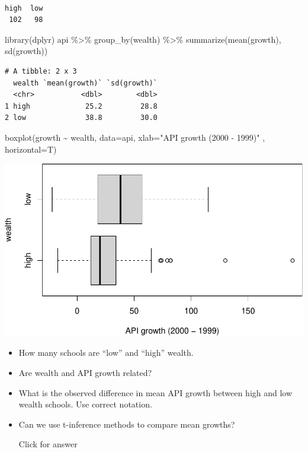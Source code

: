 \documentclass[
]{book}
\newenvironment{Shaded}{\begin{snugshade}}{\end{snugshade}}
\newcommand{\AttributeTok}[1]{\textcolor[rgb]{0.77,0.63,0.00}{#1}}
\newcommand{\FunctionTok}[1]{\textcolor[rgb]{0.00,0.00,0.00}{#1}}
\newcommand{\NormalTok}[1]{#1}
\newcommand{\SpecialCharTok}[1]{\textcolor[rgb]{0.00,0.00,0.00}{#1}}
\newcommand{\StringTok}[1]{\textcolor[rgb]{0.31,0.60,0.02}{#1}}
\providecommand{\tightlist}{%
  \setlength{\itemsep}{0pt}\setlength{\parskip}{0pt}}
\begin{document}
\begin{verbatim}

high  low 
 102   98 
\end{verbatim}

\begin{Shaded}
\begin{Highlighting}[]
\FunctionTok{library}\NormalTok{(dplyr)}
\NormalTok{api }\SpecialCharTok{\%\textgreater{}\%} \FunctionTok{group\_by}\NormalTok{(wealth) }\SpecialCharTok{\%\textgreater{}\%} \FunctionTok{summarize}\NormalTok{(}\FunctionTok{mean}\NormalTok{(growth), }\FunctionTok{sd}\NormalTok{(growth))}
\end{Highlighting}
\end{Shaded}

\begin{verbatim}
# A tibble: 2 x 3
  wealth `mean(growth)` `sd(growth)`
  <chr>           <dbl>        <dbl>
1 high             25.2         28.8
2 low              38.8         30.0
\end{verbatim}

\begin{Shaded}
\begin{Highlighting}[]
\FunctionTok{boxplot}\NormalTok{(growth }\SpecialCharTok{\textasciitilde{}}\NormalTok{ wealth, }\AttributeTok{data=}\NormalTok{api, }\AttributeTok{xlab=}\StringTok{"API growth (2000 {-} 1999)"}\NormalTok{ , }\AttributeTok{horizontal=}\NormalTok{T)}
\end{Highlighting}
\end{Shaded}

\includegraphics[width=1\linewidth]{Class_Activity_20_files/figure-latex/unnamed-chunk-2-1}

\begin{itemize}
\tightlist
\item
  How many schools are ``low'' and ``high'' wealth.
\item
  Are wealth and API growth related?
\item
  What is the observed difference in mean API growth between high and low wealth schools. Use correct notation.
\item
  Can we use t-inference methods to compare mean growths?

  Click for answer
\end{itemize}
\end{document}
